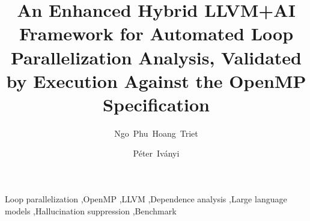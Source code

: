 \documentclass[preprint,12pt]{elsarticle}
\begin{document}
\sloppy

\begin{frontmatter}

\title{An Enhanced Hybrid LLVM+AI Framework for Automated Loop Parallelization Analysis, Validated by Execution Against the OpenMP Specification}

\author[1]{Ngo~Phu~Hoang~Triet\texorpdfstring{}{}}
\author[1]{P\'eter~Iv\'anyi}

\address[1]{Department of Computer Science and Engineering, University of P\'ecs, Hungary}

\begin{abstract}

\end{abstract}

\begin{keyword}
Loop parallelization \sep OpenMP \sep LLVM \sep Dependence analysis \sep Large language models \sep Hallucination suppression \sep Benchmark
\end{keyword}

\end{frontmatter}












\end{document}
